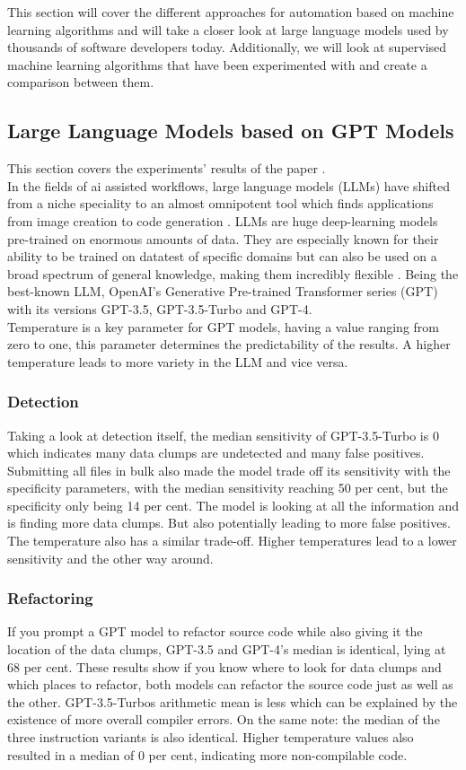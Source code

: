This section will cover the different approaches for automation based on machine learning algorithms and will take a closer look at large language models used by thousands of software developers today. Additionally, we will look at supervised machine learning algorithms that have been experimented with and create a comparison between them.
\subsection{Large Language Models based on GPT Models}
This section covers the experiments' results of the paper \cite[AI-Driven Refactoring: A Pipeline for Identifying and Correcting Data Clumps in Git Repositories]{baumgartner2024aidriven}.\\
In the fields of ai assisted workflows, large language models (LLMs) have shifted from a niche speciality to an almost omnipotent tool which finds applications from image creation to code generation \cite{meyer2024ai}. LLMs are huge deep-learning models pre-trained on enormous amounts of data. They are especially known for their ability to be trained on datatest of specific domains but can also be used on a broad spectrum of general knowledge, making them incredibly flexible \cite{baumgartner2024aidriven}.
Being the best-known LLM, OpenAI's Generative Pre-trained Transformer series (GPT) with its versions GPT-3.5, GPT-3.5-Turbo and GPT-4.\\
Temperature is a key parameter for GPT models, having a value ranging from zero to one, this parameter determines the predictability of the results.
A higher temperature leads to more variety in the LLM and vice versa.
\subsubsection{Detection}
Taking a look at detection itself, the median sensitivity of GPT-3.5-Turbo is 0 which indicates many data clumps are undetected and many false positives.
Submitting all files in bulk also made the model trade off its sensitivity with the specificity parameters, with the median sensitivity reaching 50 per cent, but the specificity only being 14 per cent.
The model is looking at all the information and is finding more data clumps. But also potentially leading to more false positives.
The temperature also has a similar trade-off. Higher temperatures lead to a lower sensitivity and the other way around.
\subsubsection{Refactoring}
If you prompt a GPT model to refactor source code while also giving it the location of the data clumps, GPT-3.5 and GPT-4's median is identical, lying at 68 per cent.
These results show if you know where to look for data clumps and which places to refactor, both models can refactor the source code just as well as the other.
GPT-3.5-Turbos arithmetic mean is less which can be explained by the existence of more overall compiler errors.
On the same note: the median of the three instruction variants is also identical.
Higher temperature values also resulted in a median of 0 per cent, indicating more non-compilable code.
